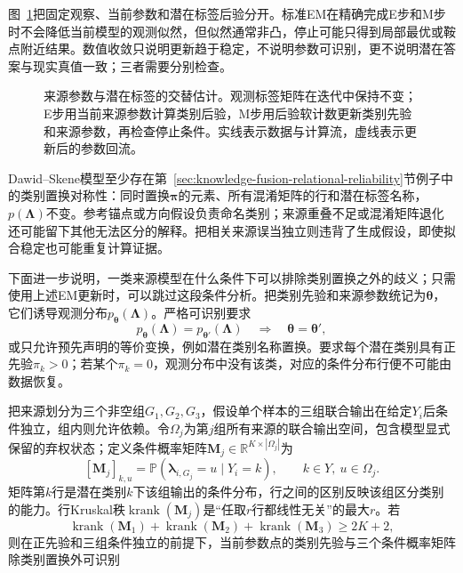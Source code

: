 图~\ref{fig:knowledge-fusion-latent-label-em}把固定观察、当前参数和潜在标签后验分开。标准EM在精确完成E步和M步时不会降低当前模型的观测似然，但似然通常非凸，停止可能只得到局部最优或鞍点附近结果。数值收敛只说明更新趋于稳定，不说明参数可识别，更不说明潜在答案与现实真值一致；三者需要分别检查。

\begin{figure}[!t]
  \centering
  
  \caption{来源参数与潜在标签的交替估计。观测标签矩阵在迭代中保持不变；E步用当前来源参数计算类别后验，M步用后验软计数更新类别先验和来源参数，再检查停止条件。实线表示数据与计算流，虚线表示更新后的参数回流。}
  \label{fig:knowledge-fusion-latent-label-em}
\end{figure}

Dawid--Skene模型至少存在第~\ref{sec:knowledge-fusion-relational-reliability}节例子中的类别置换对称性：同时置换$\bm{\pi}$的元素、所有混淆矩阵的行和潜在标签名称，$p(\bm{\Lambda})$不变。参考锚点或方向假设负责命名类别；来源重叠不足或混淆矩阵退化还可能留下其他无法区分的解释。把相关来源误当独立则违背了生成假设，即使拟合稳定也可能重复计算证据。

下面进一步说明，一类来源模型在什么条件下可以排除类别置换之外的歧义；只需使用上述EM更新时，可以跳过这段条件分析。把类别先验和来源参数统记为$\bm{\theta}$，它们诱导观测分布$p_{\bm{\theta}}(\bm{\Lambda})$。严格可识别要求
\[
  p_{\bm{\theta}}(\bm{\Lambda})
  =p_{\bm{\theta}'}(\bm{\Lambda})
  \quad\Longrightarrow\quad
  \bm{\theta}=\bm{\theta}',
\]
或只允许预先声明的等价变换，例如潜在类别名称置换。要求每个潜在类别具有正先验$\pi_k>0$；若某个$\pi_k=0$，观测分布中没有该类，对应的条件分布行便不可能由数据恢复。

\Needspace{45mm}
把来源划分为三个非空组$G_1,G_2,G_3$，假设单个样本的三组联合输出在给定$Y_i$后条件独立，组内则允许依赖。令$\Omega_j$为第$j$组所有来源的联合输出空间，包含模型显式保留的弃权状态；定义条件概率矩阵$\bm{M}_j\in\mathbb{R}^{K\times|\Omega_j|}$为
\[
  [\bm{M}_j]_{k,u}
  =\mathbb{P}(\bm{\lambda}_{i,G_j}=u\mid Y_i=k),
  \qquad
  k\in Y,\ u\in\Omega_j.
\]
矩阵第$k$行是潜在类别$k$下该组输出的条件分布，行之间的区别反映该组区分类别的能力。行Kruskal秩$\operatorname{krank}(\bm{M}_j)$是“任取$r$行都线性无关”的最大$r$。若
\begin{equation}
  \operatorname{krank}(\bm{M}_1)
  +\operatorname{krank}(\bm{M}_2)
  +\operatorname{krank}(\bm{M}_3)
  \geq 2K+2,
  \label{eq:knowledge-fusion-kruskal-condition}
\end{equation}
则在正先验和三组条件独立的前提下，当前参数点的类别先验与三个条件概率矩阵除类别置换外可识别

